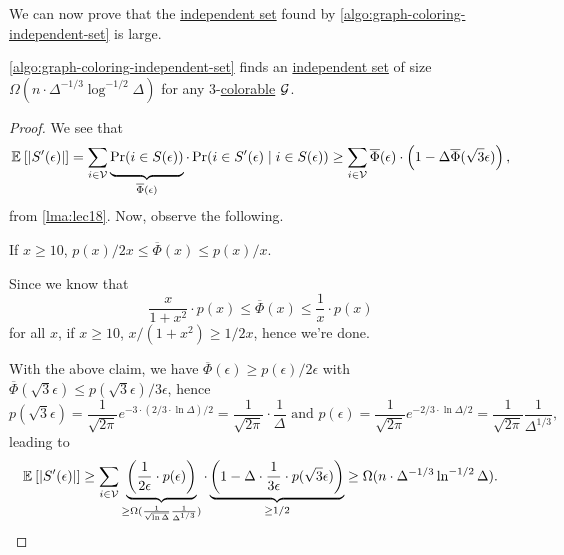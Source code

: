 We can now prove that the \hyperref[def:independent-set]{independent set} found by \autoref{algo:graph-coloring-independent-set} is large.

\begin{theorem}\label{thm:lec18}
	\autoref{algo:graph-coloring-independent-set} finds an \hyperref[def:independent-set]{independent set} of size \(\Omega (n\cdot \Delta ^{-1 / 3}\log^{-1 / 2} \Delta )\) for any \(3\)-\hyperref[def:coloring]{colorable} \(\mathcal{\MakeUppercase{g}} \).
\end{theorem}
\begin{proof}
	We see that
	\[
		\mathbb{E}_{}\left[\left\vert S^\prime (\epsilon ) \right\vert  \right]
		= \sum_{i\in \mathcal{\MakeUppercase{v}} } \underbrace{\Pr_{}(i\in S(\epsilon ))}_{\overline{\Phi }(\epsilon )}\cdot \Pr_{}(i\in S^\prime (\epsilon )\mid i\in S(\epsilon ))
		\geq  \sum_{i\in \mathcal{\MakeUppercase{v}} } \overline{\Phi }(\epsilon )\cdot \left( 1 - \Delta \overline{\Phi }(\sqrt{3}\epsilon  ) \right),
	\]
	from \autoref{lma:lec18}. Now, observe the following.

	\begin{claim}
		If \(x \geq 10\), \(p(x) / 2x \leq \overline{\Phi}(x) \leq p(x) / x\).
	\end{claim}
	\begin{explanation}
		Since we know that
		\[
			\frac{x}{1+x^{2} }\cdot p(x) \leq \overline{\Phi }(x) \leq \frac{1}{x}\cdot p(x)
		\]
		for all \(x\), if \(x \geq 10\), \(x / (1 + x^{2} ) \geq 1 / 2x\), hence we're done.
	\end{explanation}

	With the above claim, we have \(\overline{\Phi }(\epsilon )\geq p(\epsilon ) / 2\epsilon \) with \(\overline{\Phi }(\sqrt{3}\epsilon) \leq p(\sqrt{3}\epsilon) / 3\epsilon\), hence
	\[
		p(\sqrt{3} \epsilon )
		= \frac{1}{\sqrt{2\pi } } e^{- 3\cdot (2 / 3 \cdot \ln \Delta ) / 2}
		= \frac{1}{\sqrt{2\pi } }\cdot \frac{1}{\Delta }
		\text{ and }p(\epsilon )
		= \frac{1}{\sqrt{2\pi } } e^{- 2 / 3 \cdot \ln \Delta / 2}
		= \frac{1}{\sqrt{2\pi } }\frac{1}{\Delta ^{1 / 3}},
	\]
	leading to
	\[
		\mathbb{E}_{}\left[\left\vert S^\prime (\epsilon ) \right\vert  \right]
		\geq \sum_{i\in \mathcal{\MakeUppercase{v}} } \underbrace{\left( \frac{1}{2\epsilon }\cdot p(\epsilon ) \right)}_{\geq \Omega (\frac{1}{\sqrt{\ln \Delta } } \frac{1}{\Delta ^{1 / 3}})} \cdot \underbrace{\left( 1 - \Delta \cdot \frac{1}{3\epsilon }\cdot p(\sqrt{3} \epsilon ) \right)}_{\geq 1 / 2}
		\geq \Omega (n\cdot \Delta ^{-1 / 3} \ln ^{-1 / 2}\Delta ).
	\]
\end{proof}

